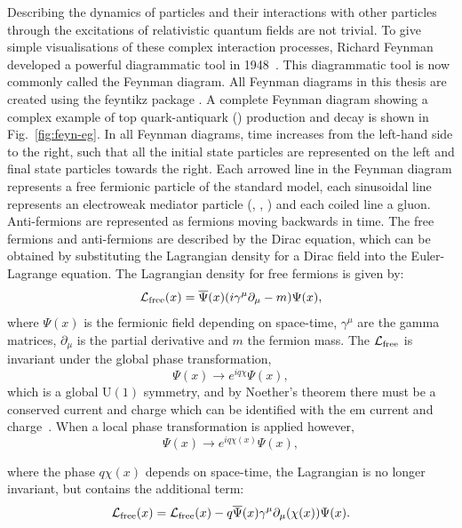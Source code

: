 Describing the dynamics of particles and their interactions with other particles through the excitations of relativistic quantum fields are not trivial.
To give simple visualisations of these complex interaction processes, Richard Feynman developed a powerful diagrammatic tool in 1948~\cite{Th:Feynman1, Th:Feynman2}.
This diagrammatic tool is now commonly called the Feynman diagram.
All Feynman diagrams in this thesis are created using the feyntikz package \cite{feyntikz}.
A complete Feynman diagram showing a complex example of top quark-antiquark (\ttbar{}) production and decay is shown in Fig.~\ref{fig:feyn-eg}.
In all Feynman diagrams, time increases from the left-hand side to the right, such that all the initial state particles are represented on the left and final state particles towards the right.
Each arrowed line in the Feynman diagram represents a free fermionic particle of the standard model, each sinusoidal line represents an electroweak mediator particle (\Wboson{}, \Zboson{}, \photon{}) and each coiled line a gluon.
Anti-fermions are represented as fermions moving backwards in time.
The free fermions and anti-fermions are described by the Dirac equation, which can be obtained by substituting the Lagrangian density for a Dirac field into the Euler-Lagrange equation. 
The Lagrangian density for free fermions is given by:
\begin{equation}
\mathcal{L}_{\text{free}}(x) = \overline{\Psi}(x)(i\gamma^{\mu}\partial_{\mu}-m)\Psi(x),
\end{equation}
where $\Psi(x)$ is the fermionic field depending on space-time, $\gamma^{\mu}$ are the gamma matrices, $\partial_{\mu}$ is the partial derivative and $m$ the fermion mass.
The $\mathcal{L}_{\text{free}}$ is invariant under the global phase transformation,
\begin{equation}
\Psi(x) \to e^{iq\chi}\Psi(x),
\end{equation}
which is a global $\mathrm{U(1)}$ symmetry, and by Noether's theorem there must be a conserved current and charge which can be identified with the \acrshort{em} current and charge~\cite{Th:Noether}.
When a local phase transformation is applied however,
\begin{equation}
\Psi(x) \to e^{iq\chi(x)}\Psi(x),
\end{equation}

where the phase $q\chi(x)$ depends on space-time, the Lagrangian is no longer invariant, but contains the additional term:
\begin{equation}
\mathcal{L}_{\text{free}}(x) = \mathcal{L}_{\text{free}}(x)-q\overline{\Psi}(x)\gamma^{\mu}\partial_{\mu}(\chi(x))\Psi(x).
\end{equation}
